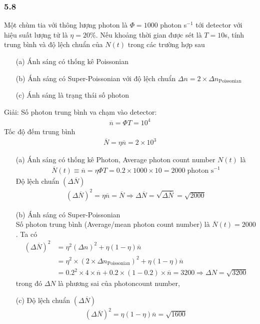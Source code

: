 \documentclass{article}
\begin{document}
\subsubsection*{5.8}
Một chùm tia với thông lượng photon là $\Phi = 1000$ photon s$^{-1}$ tới detector với hiệu suất lượng tử là $\eta = 20 \%$. Nếu khoảng thời gian được sét là $T = 10$s, tính trung bình và độ lệch chuẩn của $N(t)$ trong các trường hợp sau
\begin{enumerate}
	\item[(a)] Ánh sáng có thống kê Poissonian
	\item[(b)] Ánh sáng có Super-Poissonian với độ lệch chuẩn $\Delta n = 2\times \Delta n_{\text{Poissonian}}$
	\item[(c)] Ánh sáng là trạng thái số photon
\end{enumerate}
Giải:
Số photon trung bình va chạm vào detector:
\begin{align*}
	\overline{n} = \Phi T = 10^4
\end{align*}
Tốc độ đếm trung bình 
\begin{align*}
	\overline{N} = \eta \overline{n} = 2\times 10^3
\end{align*}
\begin{enumerate}
	\item[(a)] Ánh sáng có thống kê Photon, Average photon count number $N(t)$ là
	\begin{align*}
		\overline{N}(t) \equiv \overline{n}= \eta \Phi T = 0.2 \times 1000 \times 10 = 2000 \; \text{photon s}^{-1}
	\end{align*} 
	Độ lệch chuẩn $(\Delta \overline{N})$ 
	\begin{align*}
		(\Delta \overline{N})^2 = \eta \overline{n} = \overline{N} \Rightarrow \Delta \overline{N} = \sqrt{\Delta \overline{N}} = \sqrt{2000}
	\end{align*}
	\item[(b)] Ánh sáng có Super-Poissonian\\
	Số photon trung bình (Average/mean photon count number) là $\overline{N}(t) = 2000$. Ta có
	\begin{align*}
		(\Delta \overline{N})^2 
		&= \eta^2 (\Delta n)^2 + \eta ( 1 - \eta ) \overline{n} \tag{5.56 M.Fox} \\ 
		&=  \eta^2 \times (2 \times \Delta n_{\text{Poissonian}})^2 + \eta ( 1 - \eta ) \overline{n} \\
		& = 0.2^2 \times 4 \times \overline{n} + 0.2 \times (1 - 0.2) \times \overline{n} = 3200 \Rightarrow \Delta N = \sqrt{3200} \tag{5.15 M.Fox}
	\end{align*}
	trong đó $\Delta N$ là phương sai của photoncount number,
	\item[(c)]
	Độ lệch chuẩn $(\Delta \overline{N})$ 
	\begin{align*}
		(\Delta \overline{N})^2 = \eta(1-\eta) \overline{n} = \sqrt{1600}
	\end{align*}
\end{enumerate}
\end{document}
